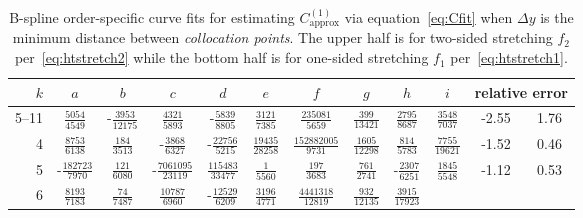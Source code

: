 \documentclass[letterpaper,11pt,nointlimits,reqno,draft]{amsbook}
\begin{document}
\begin{table}
\centering
\caption{
    B-spline order-specific curve fits for estimating $C_\text{approx}^{(1)}$
    via equation~\eqref{eq:Cfit} when $\Delta{}y$ is the minimum distance
    between \emph{collocation points}.  The upper half is for two-sided
    stretching $f_2$ per~\eqref{eq:htstretch2} while the bottom half is for
    one-sided stretching $f_1$ per~\eqref{eq:htstretch1}.
}
\label{tab:C1fit}
\renewcommand{\arraystretch}{1.40}   %
\begin{tabular}{r|ccccccccc|c@{ -- }c@{\%}}
 $k$ & $a$ & $b$ & $c$ & $d$ & $e$ & $f$ & $g$ & $h$ & $i$
     & \multicolumn{2}{c}{relative error}
\\ \hline
5--11
&  $\frac{            5054}{            4549}$
& -$\frac{            3953}{           12175}$
&  $\frac{            4321}{            5893}$
& -$\frac{            5839}{            8805}$
&  $\frac{            3121}{            7385}$
&  $\frac{          235081}{            5659}$
&  $\frac{             399}{           13421}$
&  $\frac{            2795}{            8687}$
&  $\frac{            3548}{            7037}$
&  -2.55 &  1.76
\\
4
&  $\frac{            8753}{            6138}$
&  $\frac{             184}{            3513}$
& -$\frac{            3868}{            6327}$
& -$\frac{           22756}{            5215}$
&  $\frac{           19435}{           28258}$
&  $\frac{       152882005}{            9731}$
&  $\frac{            1605}{           12298}$
&  $\frac{             814}{            5783}$
&  $\frac{            7755}{           19621}$
&  -1.52 &  0.46
\\
5
& -$\frac{          182723}{            7970}$
&  $\frac{             121}{            6080}$
& -$\frac{         7061095}{           23119}$
&  $\frac{          115483}{           33477}$
&  $\frac{               1}{            5560}$
&  $\frac{             197}{            3683}$
&  $\frac{             761}{            2741}$
& -$\frac{            2307}{            6251}$
&  $\frac{            1845}{            5548}$
&  -1.12 &  0.53
\\
6
&  $\frac{            8193}{            7183}$
&  $\frac{              74}{            7487}$
&  $\frac{           10787}{            6960}$
& -$\frac{           12529}{            6209}$
&  $\frac{            3196}{            4771}$
&  $\frac{         4441318}{           12819}$
&  $\frac{             932}{           12135}$
&  $\frac{            3915}{           17923}$

\end{tabular}
\end{table}
\end{document}
